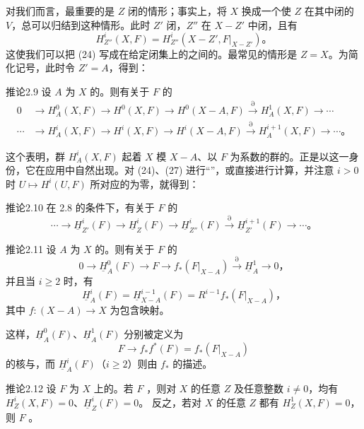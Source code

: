 对我们而言，最重要的是 $Z$ 闭的情形；事实上，将 $X$ 换成一个使 $Z$ 在其中闭的 $V$，总可以归结到这种情形。此时 $Z'$ 闭，$Z''$ 在 $X-Z'$ 中闭，且有
\[
H_{Z''}^i(X,F)=H_{Z''}^i(X-Z',F|_{X-Z'})。\tag{26}
\]
这使我们可以把 (24) 写成在给定闭集上的之间的。最常见的情形是 $Z=X$。为简化记号，此时令 $Z'=A$，得到：
\begin{SGAresult}{推论}{2.9}
设 $A$ 为 $X$ 的。则有关于 $F$ 的
\[
\begin{aligned}
0&\longrightarrow H_A^0(X,F)\longrightarrow H^0(X,F)
\longrightarrow H^0(X-A,F)\xrightarrow{\partial}H_A^1(X,F)
\longrightarrow\cdots\\
\cdots&\longrightarrow H_A^i(X,F)\longrightarrow H^i(X,F)
\longrightarrow H^i(X-A,F)\xrightarrow{\partial}H_A^{i+1}(X,F)
\longrightarrow\cdots。
\end{aligned}\tag{27}
\]
\end{SGAresult}
这个表明，群 $H_A^i(X,F)$ 起着 $X$ 模 $X-A$、以 $F$ 为系数的群的。正是以这一身份，它在应用中自然出现。对 (24)、(27) 进行“”，或直接进行计算，并注意 $i>0$ 时 $U\mapsto H^i(U,F)$ 所对应的为零，就得到：
\begin{SGAresult}{推论}{2.10}
在 2.8 的条件下，有关于 $F$ 的
\[
\cdots\longrightarrow\underline H_{Z'}^i(F)
\longrightarrow\underline H_Z^i(F)
\longrightarrow\underline H_{Z''}^i(F)
\xrightarrow{\partial}\underline H_{Z'}^{i+1}(F)\longrightarrow\cdots。\tag{24 bis}
\]
\end{SGAresult}
\begin{SGAresult}{推论}{2.11}
设 $A$ 为 $X$ 的。则有关于 $F$ 的
\[
0\longrightarrow\underline H_A^0(F)\longrightarrow F
\longrightarrow f_*(F|_{X-A})
\xrightarrow{\partial}\underline H_A^1\longrightarrow0，\tag{28}
\]
并且当 $i\ge2$ 时，有
\[
\underline H_A^i(F)=\underline H_{X-A}^{i-1}(F)
=R^{i-1}f_*(F|_{X-A})，\tag{29}
\]
其中 $f:(X-A)\to X$ 为包含映射。
\end{SGAresult}
这样，$\underline H_A^0(F)$、$\underline H_A^1(F)$ 分别被定义为
\[
F\longrightarrow f_*f^*(F)=f_*(F|_{X-A})
\]
的核与，而 $\underline H_A^i(F)$（$i\ge2$）则由 $f_*$ 的描述。
\begin{SGAresult}{推论}{2.12}
设 $F$ 为 $X$ 上的。若 $F$ ，则对 $X$ 的任意 $Z$ 及任意整数 $i\ne0$，均有
$H_Z^i(X,F)=0$、$\underline H_Z^i(F)=0$。
反之，若对 $X$ 的任意 $Z$ 都有 $H_Z^1(X,F)=0$，则 $F$ 。
\end{SGAresult}

